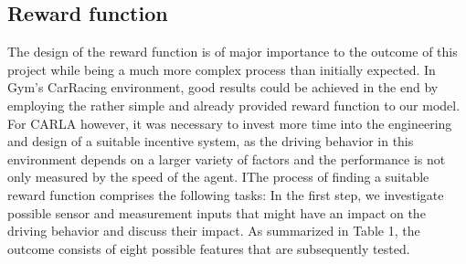\documentclass[letterpaper, 10 pt, conference]{ieeeconf}  %
\begin{document}
\subsection{Reward function}
The design of the reward function is of major importance to the outcome of this project while being a much more complex process than initially expected. In Gym's CarRacing environment, good results could be achieved in the end by employing the rather simple and already provided reward function to our model. For CARLA however, it was necessary to invest more time into the engineering and design of a suitable incentive system, as the driving behavior in this environment depends on a larger variety of factors and the performance is not only measured by the speed of the agent. IThe process of finding a suitable reward function comprises the following tasks: \newline 
In the first step, we investigate possible sensor and measurement inputs that might have an impact on the driving behavior and discuss their impact. As summarized in Table 1, the outcome consists of eight possible features that are subsequently tested.
\end{document}
